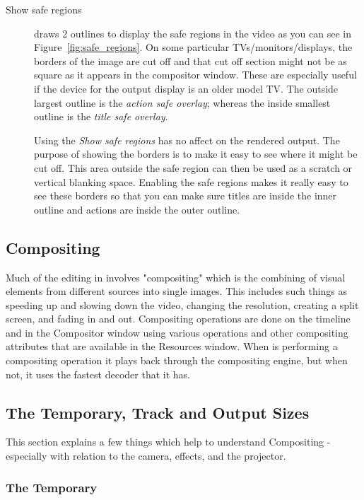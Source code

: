 \begin{description}
    \item[Show safe regions]  draws 2 outlines to display the safe regions in the video as you
can see in Figure~\ref{fig:safe_regions}.
On some particular TVs/monitors/displays, the borders of the image are cut off and that
cut off section might not be as square as it appears in the compositor window. 
These are especially useful if the device for the output display is an older model TV.
The outside largest outline is the \textit{action safe overlay}; whereas the inside smallest
outline is the \textit{title safe overlay}.

Using the \textit{Show safe regions} has no affect on the rendered output.
The purpose of showing the borders is to make it easy to see where it might be cut off.  This
area outside the safe region can then be used as
a scratch or vertical blanking space.  Enabling the safe regions makes it really
easy to see these borders so that you can make sure 
titles are inside the inner outline and actions are inside the outer outline.

\end{description}

\subsection{Compositing}%
\label{sub:compositing}

Much of the editing in \CGG{} involves "compositing" which is the combining of visual
elements from different sources into single images.  This includes such things as 
speeding up and slowing down the video, changing the resolution, creating a split screen, and fading in and out.
Compositing operations are done on the timeline and in the Compositor window using various
operations and other compositing attributes that are available in the Resources window.
When \CGG{} is performing a compositing operation it plays back through the
compositing engine, but when not, it uses the fastest decoder that it has.

\subsection{The Temporary, Track and Output Sizes}%
\label{sub:track_and_output_sizes}

This section explains a few things which help to understand Compositing - especially with relation
to the camera, effects, and the projector.

\subsubsection*{The Temporary}%
\label{ssub:output_size}

